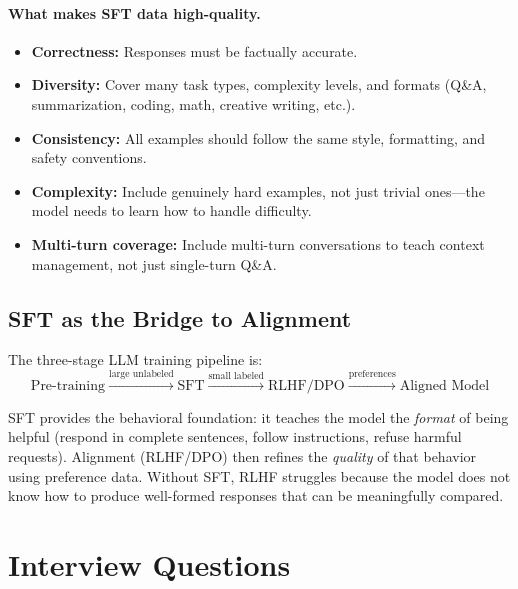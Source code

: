 \paragraph{What makes SFT data high-quality.}
\begin{itemize}
    \item \textbf{Correctness:} Responses must be factually accurate.
    \item \textbf{Diversity:} Cover many task types, complexity levels, and
          formats (Q\&A, summarization, coding, math, creative writing, etc.).
    \item \textbf{Consistency:} All examples should follow the same style,
          formatting, and safety conventions.
    \item \textbf{Complexity:} Include genuinely hard examples, not just
          trivial ones---the model needs to learn how to handle difficulty.
    \item \textbf{Multi-turn coverage:} Include multi-turn conversations to
          teach context management, not just single-turn Q\&A.
\end{itemize}

\subsection{SFT as the Bridge to Alignment}

The three-stage LLM training pipeline is:
\[
    \text{Pre-training} \xrightarrow{\text{large unlabeled}} \text{SFT}
    \xrightarrow{\text{small labeled}} \text{RLHF/DPO}
    \xrightarrow{\text{preferences}} \text{Aligned Model}
\]

SFT provides the behavioral foundation: it teaches the model the
\emph{format} of being helpful (respond in complete sentences, follow
instructions, refuse harmful requests).  Alignment (RLHF/DPO) then refines
the \emph{quality} of that behavior using preference data.  Without SFT, RLHF
struggles because the model does not know how to produce well-formed responses
that can be meaningfully compared.


\section{Interview Questions}
\label{sec:pretraining-questions}

